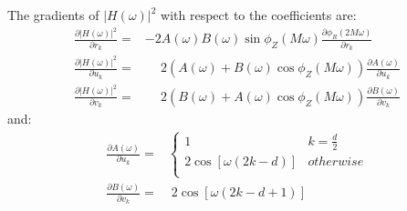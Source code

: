 \documentclass[a4paper,twoside,10pt,english]{report}
\begin{document}
The gradients of $\left|H\left(\omega\right)\right|^{2}$ with respect to the 
coefficients are:
\begin{align*}
  \frac{\partial\left|H\left(\omega\right)\right|^{2}}{\partial r_{k}}=
  &-2A\left(\omega\right)B\left(\omega\right)
    \sin\phi_{Z}\left(M\omega\right)
    \frac{\partial \phi_{R}\left(2M\omega\right)}{\partial r_{k}} \\
  \frac{\partial\left|H\left(\omega\right)\right|^{2}}{\partial u_{k}}=
  &\phantom{-} 2\left(A\left(\omega\right)+
    B\left(\omega\right)\cos\phi_{Z}\left(M\omega\right)\right)
    \frac{\partial A\left(\omega\right)}{\partial u_{k}}\\
  \frac{\partial\left|H\left(\omega\right)\right|^{2}}{\partial v_{k}}=
  &\phantom{-} 2\left(B\left(\omega\right)+
    A\left(\omega\right)\cos\phi_{Z}\left(M\omega\right)\right)
    \frac{\partial B\left(\omega\right)}{\partial v_{k}}
\end{align*}
and:
\begin{align*}
  \frac{\partial A\left(\omega\right)}{\partial u_{k}} =
  & \begin{cases}
    1 & k=\frac{d}{2} \\
    2\cos\left[\omega{}\left(2k-d\right)\right] & otherwise \\
    \end{cases}\\
  \frac{\partial B\left(\omega\right)}{\partial v_{k}} =
  &\; 2\cos\left[\omega{}\left(2k-d+1\right)\right]
\end{align*}

\begin{comment}
The gradients of $\arg H\left(\omega\right)$ with respect to the coefficients
are given by:
\begin{align*}
  \left|H\left(\omega\right)\right|^{2}
  \frac{\partial\arg H\left(\omega\right)}{\partial r_{k}}
  =& \left(A^{2}\left(\omega\right)+A\left(\omega\right)B\left(\omega\right)
  \cos\phi_{Z}\left(M\omega\right)\right)
     \frac{\partial\phi_{R}\left(2M\omega\right)}{\partial r_{k}} \\
  \left|H\left(\omega\right)\right|^{2} 
  \frac{\partial\arg H\left(\omega\right)}{\partial u_{k}}
  =& \sin\phi_{Z}\left(M\omega\right)B\left(\omega\right)
     \frac{\partial A\left(\omega\right)}{\partial u_{k}} \\
  \left|H\left(\omega\right)\right|^{2} 
  \frac{\partial\arg H\left(\omega\right)}{\partial v_{k}}
  =& -\sin\phi_{Z}\left(M\omega\right)A\left(\omega\right)
     \frac{\partial B\left(\omega\right)}{\partial v_{k}} 
\end{align*}
\end{comment}
\end{document}
